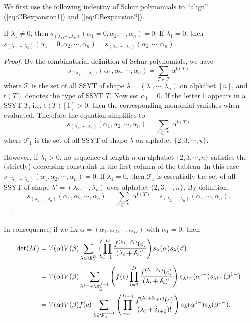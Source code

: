 We first use the following indentity of Schur polynomials to ``align'' (\ref{eq:CBexpansion1}) and (\ref{eq:CBexpansion2}).
\begin{proposition}
If $\lambda_1 \ne 0$, then
$s_{(\lambda_1, \cdots, \lambda_n)}(\alpha_1 = 0, \alpha_2, \cdots, \alpha_n) =0$.
If $\lambda_1 = 0$, then
$s_{(\lambda_1, \cdots, \lambda_n)}(\alpha_1 = 0, \alpha_2, \cdots, \alpha_n) =
s_{(\lambda_2, \cdots, \lambda_n)}(\alpha_2, \cdots, \alpha_n)$.
\end{proposition}
\begin{proof}
By the combinatorial definition of Schur polynomials, we have
\[s_{(\lambda_1, \cdots, \lambda_n)}(\alpha_1, \alpha_2, \cdots, \alpha_n)
=\sum_{T \in \mathcal T} \alpha^{\mathrm t(T)}\]
where $\mathcal T$ is the set of all SSYT of shape $\lambda = (\lambda_1, \cdots, \lambda_n)$
on alphabet $[n]$, and $\mathrm t(T)$ denotes the type of SSYT $T$.
Now set $\alpha_1 = 0$. If the letter 1 appears in a SSYT $T$, i.e. $\mathrm t(T)[1] > 0$, then the corresponding monomial vanishes when evaluated. Therefore the equation simplifies to
\[s_{(\lambda_1, \cdots, \lambda_n)}(\alpha_1, \alpha_2, \cdots, \alpha_n)
=\sum_{T\in \mathcal T_1} \alpha^{\mathrm t(T)}\]
where $\mathcal T_1$ is the set of all SSYT of shape $\lambda$ on alphabet $\{2, 3, \cdots, n\}$.

However, if $\lambda_1 > 0$, no sequence of length $n$ on alphabet $\{2, 3, \cdots, n\}$
satisfies the (strictly) decreasing constraint in the first column of the tableau.
In this case $s_{(\lambda_1, \cdots, \lambda_n)}(\alpha_1, \alpha_2, \cdots, \alpha_n) = 0$.
If $\lambda_1 = 0$, then $\mathcal T_1$ is essentially the set of all SSYT of shape $\lambda'
=(\lambda_2, \cdots, \lambda_n)$ over alphabet $\{2, 3, \cdots, n\}$.
By definition,
\[s_{(\lambda_1, \cdots, \lambda_n)}(\alpha_1, \alpha_2, \cdots, \alpha_n)
=\sum_{T\in \mathcal T_1} \alpha^{\mathrm t(T)}
=s_{(\lambda_2, \cdots, \lambda_n)}(\alpha_2, \cdots, \alpha_n).\]
\end{proof}
In consequence, if we fix $\alpha = (\alpha_1, \alpha_2, \cdots, \alpha_D)$
with $\alpha_1 = 0$, then
\begin{align*}
\det(M) &= V(\alpha)V(\beta) \sum_{\lambda \in \N^D_{\le}}
\left(\prod_{i=1}^D \frac{f^{(\lambda_i + \delta_i)}(c)}{(\lambda_i + \delta_i)!}\right)
s_{\lambda}(\alpha)s_{\lambda}(\beta)\\
&= V(\alpha)V(\beta) \sum_{\lambda^{1-} \in \N^{D-1}_{\le}}
\left(f(c) \prod_{i=2}^{D} \frac{f^{(\lambda_i + \delta_i)}(c)}{(\lambda_i + \delta_i)!}\right)
s_{\lambda^{1-}}(\alpha^{1-})s_{\lambda^{1-}}(\beta^{1-})\\
&= V(\alpha)V(\beta) f(c) \sum_{\lambda \in \N^{D-1}_{\le}}
\left(\prod_{i=1}^{D-1} \frac{f^{(\lambda_i + \delta_{i+1})}(c)}{(\lambda_i + \delta_{i+1})!}\right)
s_{\lambda}(\alpha^{1-})s_{\lambda}(\beta^{1-}).
\end{align*}
